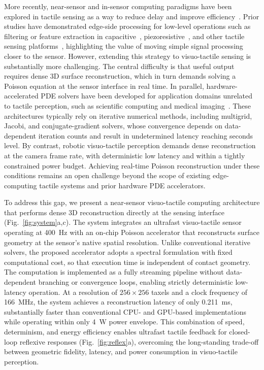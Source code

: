 \documentclass[10pt,a4paper]{article}
\begin{document}
More recently, near-sensor and in-sensor computing paradigms have been explored in tactile sensing as a way to reduce delay and improve efficiency~\cite{zhou2020nearsensor}. Prior studies have demonstrated edge-side processing for low-level operations such as filtering or feature extraction in capacitive~\cite{chen2025capacitive,cho2025npjflex}, piezoresistive~\cite{XXX}, and other tactile sensing platforms~\cite{XXX}, highlighting the value of moving simple signal processing closer to the sensor.
However, extending this strategy to visuo-tactile sensing is substantially more challenging. The central difficulty is that useful output requires dense 3D surface reconstruction, which in turn demands solving a Poisson equation at the sensor interface in real time. 
In parallel, hardware-accelerated PDE solvers have been developed for application domains unrelated to tactile perception, such as scientific computing and medical imaging~\cite{kamalakkannan2021fpgastencil,tomczak2023nsfpga,elaraby2007multigridfpga,siddiqui2017fpgasense,omer2020fpgasense}. These architectures typically rely on iterative numerical methods, including multigrid, Jacobi, and conjugate-gradient solvers, whose convergence depends on data-dependent iteration counts and result in undetermined latency reaching seconds level.
By contrast, robotic visuo-tactile perception demands dense reconstruction at the camera frame rate, with deterministic low latency and within a tightly constrained power budget. Achieving real-time Poisson reconstruction under these conditions remains an open challenge beyond the scope of existing edge-computing tactile systems and prior hardware PDE accelerators.

To address this gap, we present a near-sensor visuo-tactile computing architecture that performs dense 3D reconstruction directly at the sensing interface (Fig.~\ref{fig:system}a,c). The system integrates an ultrafast visuo-tactile sensor operating at 400~Hz with an on-chip Poisson accelerator that reconstructs surface geometry at the sensor's native spatial resolution. Unlike conventional iterative solvers, the proposed accelerator adopts a spectral formulation with fixed computational cost, so that execution time is independent of contact geometry. The computation is implemented as a fully streaming pipeline without data-dependent branching or convergence loops, enabling strictly deterministic low-latency operation.
At a resolution of $256\times256$ taxels and a clock frequency of 166~MHz, the system achieves a reconstruction latency of only 0.211~ms, substantially faster than conventional CPU- and GPU-based implementations while operating within only 4~W power envelope. This combination of speed, determinism, and energy efficiency enables ultrafast tactile feedback for closed-loop reflexive responses (Fig.~\ref{fig:reflex}a), overcoming the long-standing trade-off between geometric fidelity, latency, and power consumption in visuo-tactile perception.
\end{document}
